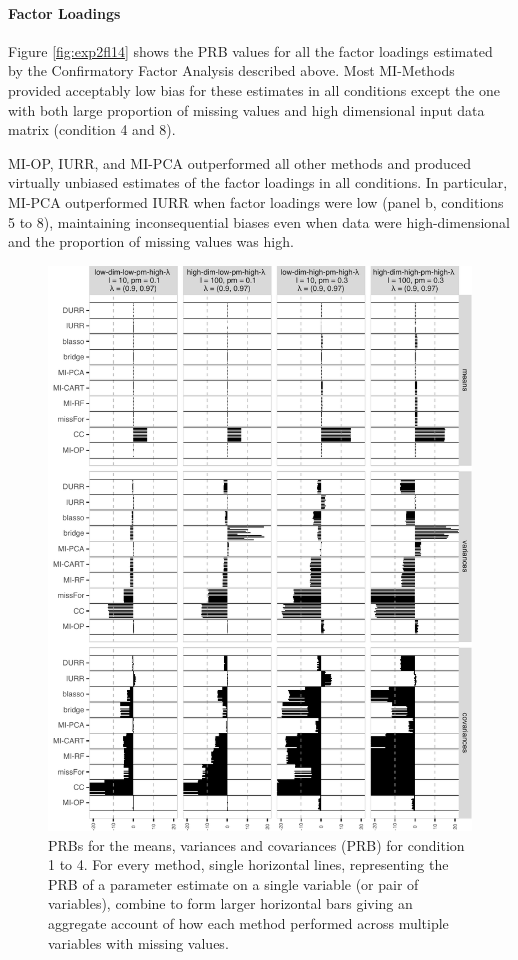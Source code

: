 \documentclass[11pt]{article}
\newenvironment{rotatepage} %
    {\clearpage\pagebreak[4]\global\pdfpageattr\expandafter{\the\pdfpageattr/Rotate 90}}%
    {\clearpage\pagebreak[4]\global\pdfpageattr\expandafter{\the\pdfpageattr/Rotate 0}}%
\begin{document}
	\paragraph{Factor Loadings}
	Figure \ref{fig:exp2fl14} shows the PRB values for all the factor loadings estimated by
	the Confirmatory Factor Analysis described above. 
	Most MI-Methods provided acceptably low bias for these estimates in all conditions except the one with 
	both large proportion of missing values and high dimensional input data matrix (condition 4 and 8).

	MI-OP, IURR, and MI-PCA outperformed all other methods and produced virtually unbiased estimates
	of the factor loadings in all conditions.
	In particular, MI-PCA outperformed IURR when factor loadings were low (panel b, conditions 5 to 8), 
	maintaining inconsequential biases even when data were high-dimensional and the proportion of missing 
	values was high.

\begin{figure}
	\includegraphics{../../output/graphs/exp2_semR_bias_14.pdf}
\caption{PRBs for the means, variances and covariances (PRB) for condition 1 to 4.
	For every method, single horizontal lines, representing the PRB of a parameter estimate on 
	a single variable (or pair of variables), combine to form larger horizontal bars giving an 
	aggregate account of how each method performed across multiple variables with missing values.
}
\label{fig:exp2bias14}
\end{figure}
\end{document}
